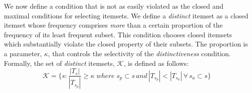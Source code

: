\documentclass{sig-alternate}
\begin{document}
We now define a condition that is not as easily violated as the closed and maximal conditions for selecting itemsets.
We define a \emph{distinct} itemset as a closed itemset whose frequency comprises \emph{more} than a certain proportion of the frequency of its least frequent subset. 
This condition chooses closed itemsets which substantially violate the closed property of their subsets. The proportion is a parameter, $\kappa$, that controls the selectivity of the \emph{distinctiveness} condition. Formally, the set of \emph{distinct} itemsets, $\mathcal{K}$, is defined as follows:
\begin{equation*}\mathcal{K} = \{s:\frac{|T_{s}|}{|T_{s_{p}}|} \ge \kappa \; where \; s_{p} \subset s \, and \, |T_{s_{p}}| < |T_{s_{a}} |\, \forall \, s_{a} \subset s \}\end{equation*}
\end{document}
